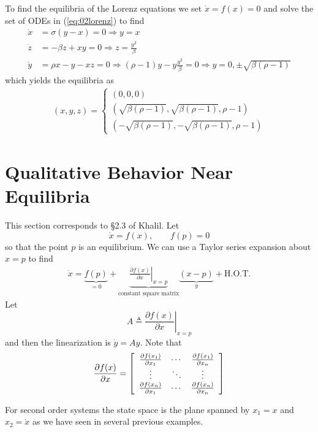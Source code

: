 To find the equilibria of the Lorenz equations we set $\dot{x}=f(x)=0$ and solve the set of ODEs in (\ref{eq:02lorenz}) to find
\begin{align*}
\dot{x} &= \sigma(y-x) = 0 \Rightarrow y = x \\
\dot{z} &= -\beta z + xy = 0 \Rightarrow z = \frac{y^2}{\beta} \\
\dot{y} &= \rho x-y-xz = 0 \Rightarrow (\rho-1)y - y\frac{y^2}{\beta} = 0 \Rightarrow y = 0, \pm\sqrt{\beta(\rho-1)}
\end{align*}
which yields the equilibria as
\begin{align*}
(x,y,z) = \begin{cases} (0,0,0) \\ (\sqrt{\beta(\rho-1)}, \sqrt{\beta(\rho-1)}, \rho-1) \\ (-\sqrt{\beta(\rho-1)}, -\sqrt{\beta(\rho-1)}, \rho-1) \end{cases}
\end{align*}

\section{Qualitative Behavior Near Equilibria}
This section corresponds to \S2.3 of Khalil. Let
$$\dot{x} = f(x), \qquad f(p) = 0$$
so that the point $p$ is an equilibrium. We can use a Taylor series expansion about $x=p$ to find
\begin{align*}
\dot{x} = \underbrace{f(p)}_{=0} + \underbrace{\left.\frac{\partial f(x)}{\partial x}\right|_{x=p}}_{\text{constant square matrix}} \underbrace{(x-p)}_{y} + \text{H.O.T.}
\end{align*}
Let
$$A \triangleq \left.\frac{\partial f(x)}{\partial x}\right|_{x=p}$$
and then the linearization is $\dot{y}=Ay$. Note that
\begin{align*}
\frac{\partial f(x)}{\partial x} = \left[\begin{array}{c c c} \frac{\partial f(x_1)}{\partial x_1} & \cdots & \frac{\partial f(x_1)}{\partial x_n} \\ \vdots & \ddots & \vdots \\ \frac{\partial f(x_n)}{\partial x_1} & \cdots & \frac{\partial f(x_n)}{\partial x_n} \end{array}\right]
\end{align*}

For second order systems the state space is the plane spanned by $x_1 = x$ and $x_2 = \dot{x}$ as we have seen in several previous examples.

